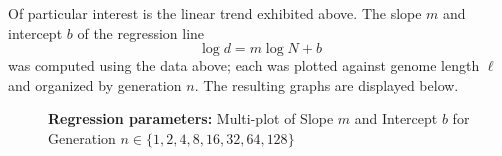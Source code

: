   Of particular interest is the linear trend exhibited above.  The
  slope $m$ and intercept $b$ of the regression line
  \begin{equation} \label{regresion}
  \log d = m \log N + b
  \end{equation}
was computed using the data above; each was plotted against genome
length $\ell$ and organized by generation $n$. The resulting
graphs are displayed below.

\begin{figure}[htp]
\begin{center}
\hspace{5pt}
\caption[\textbf{Regression parameters}]{\textbf{Regression parameters:} 
Multi-plot of Slope $m$ and Intercept $b$ for Generation  $n \in \{1,  2,  4,  8,  16,  32,  64,  128\}$ }
\label{regression-parameters}
\end{center}
\end{figure}

